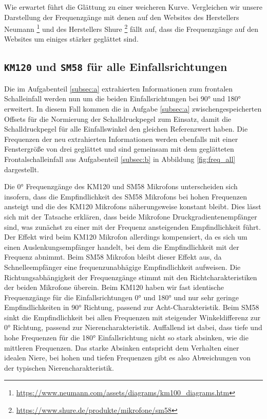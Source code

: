 Wie erwartet führt die Glättung zu einer weicheren Kurve. 
Vergleichen wir unsere Darstellung der Frequenzgänge mit denen auf den Websites des Herstellers Neumann \footnote{\url{https://www.neumann.com/assets/diagrams/km100_diagrams.htm}} und des Herstellers Shure \footnote{\url{https://www.shure.de/produkte/mikrofone/sm58}} fällt auf, dass die Frequenzgänge auf den Websites  um einiges stärker geglättet sind.


\subsection{\texttt{KM120} und \texttt{SM58} für alle Einfallsrichtungen}
\label{subsec:c}
Die im Aufgabenteil \ref{subsec:a} extrahierten Informationen zum frontalen Schalleinfall werden nun um die beiden Einfallsrichtungen bei 90° und 180° erweitert.
In diesem Fall kommen die in Aufgabe \ref{subsec:a} zwischengespeicherten Offsets für die Normierung der Schalldruckpegel zum Einsatz, damit die Schalldruckpegel für alle Einfallswinkel den gleichen Referenzwert haben.
Die Frequenzen der neu extrahierten Informationen werden ebenfalls mit einer Fenstergröße von drei geglättet und sind gemeinsam mit dem geglätteten Frontalschalleinfall aus Aufgabenteil \ref{subsec:b} in Abbildung \ref{fig:freq_all} dargestellt.

Die 0° Frequenzgänge des KM120 und SM58 Mikrofons unterscheiden sich insofern, dass die Empfindlichkeit des SM58 Mikrofons bei hohen Frequenzen ansteigt und die des KM120 Mikrofons näherungsweise konstant bleibt.
Dies lässt sich mit der Tatsache erklären, dass beide Mikrofone Druckgradientenempfänger sind, was zunächst zu einer mit der Frequenz ansteigenden Empfindlichkeit führt.
Der Effekt wird beim KM120 Mikrofon allerdings kompensiert, da es sich um einen Auslenkungsempfänger handelt, bei dem die Empfindlichkeit mit der Frequenz abnimmt.
Beim SM58 Mikrofon bleibt dieser Effekt aus, da Schnelleempfänger eine frequenzunabhägige Empfindlichkeit aufweisen.
Die Richtungsabhängigkeit der Frequenzgänge stimmt mit den Richtcharakteristiken der beiden Mikrofone überein.
Beim KM120 haben wir fast identische Frequenzgänge für die Einfallsrichtungen 0° und 180° und nur sehr geringe Empfindlichkeiten in 90° Richtung, passend zur Acht-Charakteristik.
Beim SM58 sinkt die Empfindlichkeit bei allen Frequenzen mit steigender Winkeldifferenz zur 0° Richtung, passend zur Nierencharakteristik.
Auffallend ist dabei, dass tiefe und hohe Frequenzen für die 180° Einfallsrichtung nicht so stark absinken, wie die mittleren Frequenzen.
Das starke Absinken entspricht dem Verhalten einer idealen Niere, bei hohen und tiefen Frequenzen gibt es also Abweichungen von der typischen Nierencharakteristik.  

